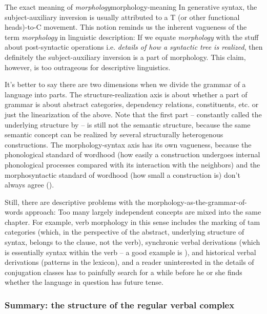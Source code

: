\documentclass[UTF8, a4paper, oneside, scheme=plain]{ctexrep}
\newcommand*{\term}[1]{\emph{#1}}
\begin{document}
\begin{theorybox}{The exact meaning of \term{morphology}}{morphology-meaning}
    In generative syntax, the subject-auxiliary inversion is usually attributed to 
    a T (or other functional heads)-to-C movement.
    This notion reminds us the inherent vagueness of the term \term{morphology} in linguistic description:
    If we equate \term{morphology} with the stuff about post-syntactic operations 
    i.e. \emph{details of how a syntactic tree is realized},
    then definitely the subject-auxiliary inversion is a part of morphology.
    This claim, however, is too outrageous for descriptive linguistics.

    It's better to say there are two dimensions 
    when we divide the grammar of a language into parts.
    The structure-realization axis is about 
    whether a part of grammar is about abstract categories, dependency relations, constituents, etc. 
    or just the linearization of the above.
    Note that the first part -- constantly called the underlying structure by \citet{dixon2009basic1} 
    -- is still not the semantic structure,
    because the same semantic concept can be realized by several structurally heterogenous constructions.
    The morphology-syntax axis has its own vagueness,
    because the phonological standard of wordhood 
    (how easily a construction undergoes internal phonological processes 
    compared with its interaction with the neighbors)
    and the morphosyntactic standard of wordhood 
    (how small a construction is)
    don't always agree ().

    Still, there are descriptive problems with the morphology-as-the-grammar-of-words approach:
    Too many largely independent concepts are mixed into the same chapter.
    For example, verb morphology in this sense includes 
    the marking of \acs{tam} categories 
    (which, in the perspective of the abstract, underlying structure of syntax, 
    belongs to the clause, not the verb),
    synchronic verbal derivations 
    (which is essentially syntax within the verb -- a good example is \citet{de2019negation}),
    and historical verbal derivations 
    (patterns in the lexicon),
    and a reader uninterested in the details of conjugation classes 
    has to painfully search for a while before he or she finds 
    whether the language in question has future tense.
\end{theorybox}

\subsubsection{Summary: the structure of the regular verbal complex}
\end{document}
